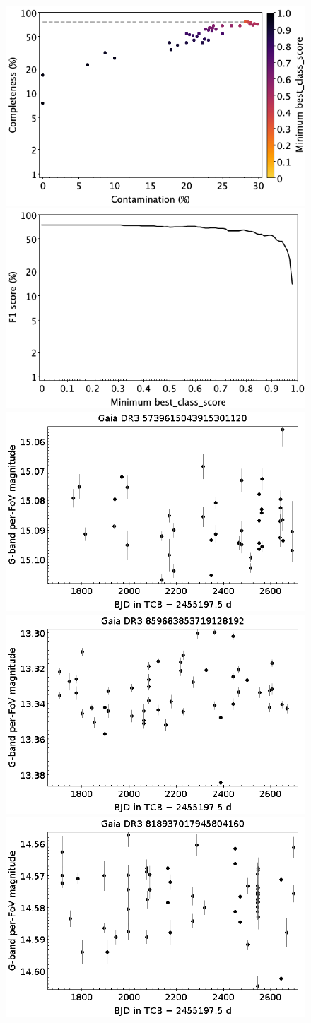 \documentclass[longauth]{aa}
\begin{document}
\begin{appendix}
\begin{figure}
\centering
{} \includegraphics[width=0.45\hsize]{figures/appendix/SDB_cls_scc.png}  
\hspace{2mm}
 \includegraphics[width=0.45\hsize]{figures/appendix/SDB_cls_sf1.png} \\ 
\vspace{4mm}
 \includegraphics[width=0.45\hsize]{figures/appendix/SDB-0-0p0875.png}  
\hspace{2mm}
 \includegraphics[width=0.45\hsize]{figures/appendix/SDB-0-0p0043.png} \\
\vspace{4mm}
 \includegraphics[width=0.45\hsize]{figures/appendix/SDB-0-0p0019.png}  

\end{figure}
\end{appendix}
\end{document}
